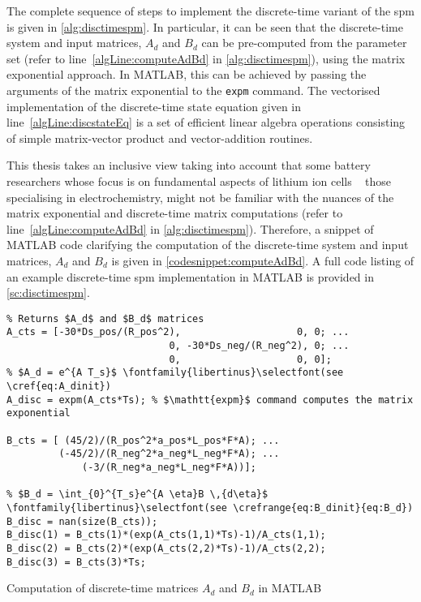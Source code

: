 The complete  sequence of steps  to implement  the discrete-time variant  of the
\gls{spm}  is given  in \cref{alg:disctimespm}. In  particular, it  can be  seen
that  the discrete-time  system  and  input matrices,  $A_d$  and  $B_d$ can  be
pre-computed  from the  parameter set  (refer to  line~\ref{algLine:computeAdBd}
in \cref{alg:disctimespm}),   using   the   matrix  exponential   approach.   In
\textsc{MATLAB}, this  can be achieved  by passing  the arguments of  the matrix
exponential to  the \verb+expm+  command. The  vectorised implementation  of the
discrete-time state equation given in line~\ref{algLine:discstateEq} is a set of
efficient linear  algebra operations consisting of  simple matrix-vector product
and vector-addition routines.



This  thesis takes  an  inclusive view  taking into  account  that some  battery
researchers whose  focus is on fundamental  aspects of lithium ion  cells \eg~
those specialising in  electrochemistry, might not be familiar  with the nuances
of  the  matrix exponential  and  discrete-time  matrix computations  (refer  to
line~\ref{algLine:computeAdBd} in \cref{alg:disctimespm}).  Therefore, a snippet
of \textsc{MATLAB} code  clarifying the computation of  the discrete-time system
and input matrices, $A_d$ and  $B_d$ is given in \cref{codesnippet:computeAdBd}.
A  full code  listing of  an example  discrete-time \gls{spm}  implementation in
\textsc{MATLAB} is provided in \cref{sc:disctimespm}.

\begin{listing}[!htbp]
\begin{verbatim}
% Returns $A_d$ and $B_d$ matrices
A_cts = [-30*Ds_pos/(R_pos^2),                    0, 0; ...
                            0, -30*Ds_neg/(R_neg^2), 0; ...
                            0,                    0, 0];
% $A_d = e^{A T_s}$ \fontfamily{libertinus}\selectfont(see \cref{eq:A_dinit})
A_disc = expm(A_cts*Ts); % $\mathtt{expm}$ command computes the matrix exponential

B_cts = [ (45/2)/(R_pos^2*a_pos*L_pos*F*A); ...
         (-45/2)/(R_neg^2*a_neg*L_neg*F*A); ...
             (-3/(R_neg*a_neg*L_neg*F*A))];

% $B_d = \int_{0}^{T_s}e^{A \eta}B \,{d\eta}$ \fontfamily{libertinus}\selectfont(see \crefrange{eq:B_dinit}{eq:B_d})
B_disc = nan(size(B_cts));
B_disc(1) = B_cts(1)*(exp(A_cts(1,1)*Ts)-1)/A_cts(1,1);
B_disc(2) = B_cts(2)*(exp(A_cts(2,2)*Ts)-1)/A_cts(2,2);
B_disc(3) = B_cts(3)*Ts;
\end{verbatim}
\caption{Computation of discrete-time matrices $A_d$ and $B_d$ in
\textsc{MATLAB}}
\label{codesnippet:computeAdBd}
\end{listing}

